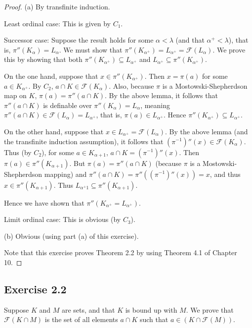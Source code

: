 \documentclass{article}
\theoremstyle{definition}
\begin{document}
\begin{proof}

(a) By transfinite induction.

Least ordinal case: This is given by $C_1$.

Successor case: Suppose the result holds for some $\alpha<\lambda$ (and that $\alpha^+<\lambda$), that is, 
$\pi''(K_\alpha)=L_\alpha$. We must show that $\pi''(K_{\alpha^+})=L_{\alpha^+}=\mathcal{F}(L_\alpha)$. We prove this by 
showing that both $\pi''(K_{\alpha^+})\subseteq L_{\alpha^+}$ and 
$L_{\alpha^+}\subseteq \pi''(K_{\alpha^+})$.

On the one hand, suppose that $x\in\pi''(K_{\alpha^+})$. Then $x=\pi(a)$ for some 
$a\in K_{\alpha^+}$. By $C_2$, $a\cap K\in\mathcal{F}(K_\alpha)$. Also, because 
$\pi$ is a Mostowski-Shepherdson map on $K$, $\pi(a)=\pi''(a\cap K)$. By the above lemma, it follows that 
$\pi''(a\cap K)$ is definable over $\pi''(K_\alpha)=L_\alpha$, meaning $\pi''(a\cap K)\in\mathcal{F}(L_\alpha)=L_{\alpha^+}$, 
that is, $\pi(a)\in L_{\alpha^+}$. Hence $\pi''(K_{\alpha^+})\subseteq L_{\alpha^+}$.

On the other hand, suppose that $x\in L_{\alpha^+}=\mathcal{F}(L_\alpha)$. By the above lemma (and the transfinite induction assumption), 
it follows that 
$(\pi^{-1})''(x)\in\mathcal{F}(K_\alpha)$. Thus (by $C_2$), for some $a\in K_{\alpha+1}$, 
$a\cap K=(\pi^{-1})''(x)$. Then $\pi(a)\in\pi''(K_{\alpha+1})$. But $\pi(a)=\pi''(a\cap K)$ (because 
$\pi$ is a Mostowski-Shepherdson mapping) and 
$\pi''(a\cap K)=\pi''((\pi^{-1})''(x))=x$, and thus $x\in\pi''(K_{\alpha+1})$. Thus 
$L_{\alpha^+1}\subseteq\pi''(K_{\alpha+1})$.

Hence we have shown that $\pi''(K_{\alpha^+}=L_{\alpha^+})$.

Limit ordinal case: This is obvious (by $C_3$).

(b) Obvious (using part (a) of this exercise).

Note that this exercise proves Theorem 2.2 by using Theorem 4.1 of Chapter 10.
\end{proof}

\subsection*{Exercise 2.2}
Suppose $K$ and $M$ are sets, and that $K$ is bound up with $M$. We prove that $\mathcal{F}(K\cap M)$ is the set of all 
elements $a\cap K$ such that $a\in (K\cap\mathcal{F}(M))$.
\end{document}
